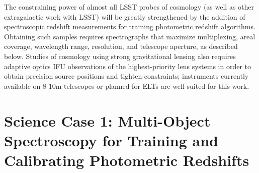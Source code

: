\documentclass[12pt]{report}
\begin{document}
The constraining power of almost all LSST probes of cosmology (as well as other extragalactic work with LSST) will be greatly strengthened by the addition of spectroscopic redshift measurements for training photometric redshift algorithms.  Obtaining such samples requires spectrographs that maximize multiplexing, areal coverage, wavelength range, resolution, and telescope aperture, as described below.  Studies of cosmology using strong gravitational lensing also requires adaptive optics IFU observations of the highest-priority lens systems in order to obtain precision source positions and tighten constraints; instruments currently available on 8-10m telescopes or planned for ELTs are well-suited for this work.


%
%


\section{Science Case 1: Multi-Object Spectroscopy for Training and Calibrating Photometric Redshifts}
\end{document}
